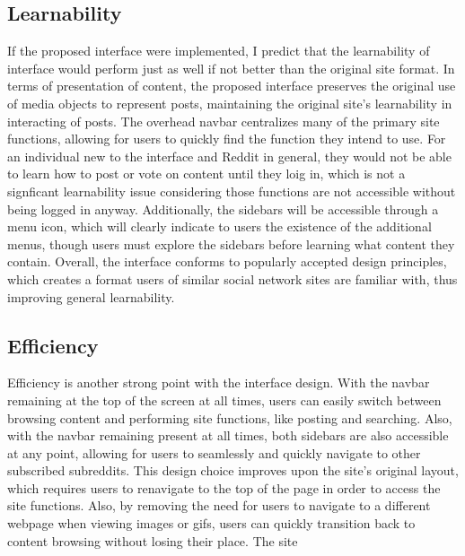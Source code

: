 \documentclass{article}
\begin{document}
\subsection{Learnability} If the proposed interface were implemented, I predict that the learnability of interface would perform just as well if not better than the original site format. In terms of presentation of content, the proposed interface preserves the original use of media objects to represent posts, maintaining the original site's learnability in interacting of posts. The overhead navbar centralizes many of the primary site functions, allowing for users to quickly find the function they intend to use. For an individual new to the interface and Reddit in general, they would not be able to learn how to post or vote on content until they loig in, which is not a signficant learnability issue considering those functions are not accessible without being logged in anyway. Additionally, the sidebars will be accessible through a menu icon, which will clearly indicate to users the existence of the additional menus, though users must explore the sidebars before learning what content they contain. Overall, the interface conforms to popularly accepted design principles, which creates a format users of similar social network sites are familiar with, thus improving general learnability.

\subsection{Efficiency} Efficiency is another strong point with the interface design. With the navbar remaining at the top of the screen at all times, users can easily switch between browsing content and performing site functions, like posting and searching. Also, with the navbar remaining present at all times, both sidebars are also accessible at any point, allowing for users to seamlessly and quickly navigate to other subscribed subreddits. This design choice improves upon the site's original layout, which requires users to renavigate to the top of the page in order to access the site functions. Also, by removing the need for users to navigate to a different webpage when viewing images or gifs, users can quickly transition back to content browsing without losing their place. The site
\end{document}
